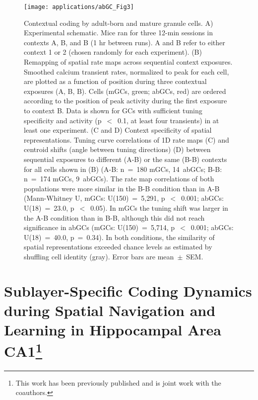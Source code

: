 \begin{figure}
	\centering
	\texttt{[image: applications/abGC\_Fig3]}
	\caption[Contextual coding by adult-born and mature granule cells]{Contextual coding by adult-born and mature granule cells.
	A) Experimental schematic. Mice ran for three 12-min sessions in contexts A, B, and B (1 hr between runs). A and B refer to either context 1 or 2 (chosen randomly for each experiment).
	(B) Remapping of spatial rate maps across sequential context exposures. Smoothed calcium transient rates, normalized to peak for each cell, are plotted as a function of position during three contextual exposures (A, B, B). Cells (mGCs, green; abGCs, red) are ordered according to the position of peak activity during the first exposure to context B. Data is shown for GCs with sufficient tuning specificity and activity (p~$<$~0.1, at least four transients) in at least one experiment.
	(C and D) Context specificity of spatial representations. Tuning curve correlations of 1D rate maps (C) and centroid shifts (angle between tuning directions) (D) between sequential exposures to different (A-B) or the same (B-B) contexts for all cells shown in (B) (A-B: n~=~180 mGCs, 14~abGCs; B-B: n~=~174 mGCs, 9~abGCs). The rate map correlations of both populations were more similar in the B-B condition than in A-B (Mann-Whitney U, mGCs: U(150)~=~5,291, p~$<$~0.001; abGCs: U(18)~=~23.0, p~$<$~0.05). In mGCs the tuning shift was larger in the A-B condition than in B-B, although this did not reach significance in abGCs (mGCs: U(150)~=~5,714, p~$<$~0.001; abGCs: U(18)~=~40.0, p~=~0.34). In both conditions, the similarity of spatial representations exceeded chance levels as estimated by shuffling cell identity (gray).
	Error bars are mean~$\pm$~SEM.}
	\label{fig:other:dg:context}
\end{figure}

\section[Sublayer-Specific Coding Dynamics during Spatial Navigation and Learning in Hippocampal Area CA1]{Sublayer-Specific Coding Dynamics during Spatial Navigation and Learning in Hippocampal Area CA1\footnote{This work has been previously published \citep{Danielson2016b} and is joint work with the coauthors.}}

